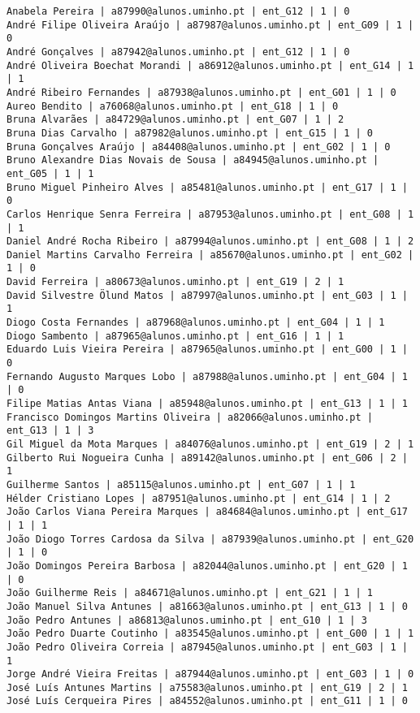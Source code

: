 \documentclass[11pt,a4paper]{report}%
\begin{document}
\begin{verbatim}
Anabela Pereira | a87990@alunos.uminho.pt | ent_G12 | 1 | 0
André Filipe Oliveira Araújo | a87987@alunos.uminho.pt | ent_G09 | 1 | 0
André Gonçalves | a87942@alunos.uminho.pt | ent_G12 | 1 | 0
André Oliveira Boechat Morandi | a86912@alunos.uminho.pt | ent_G14 | 1 | 1
André Ribeiro Fernandes | a87938@alunos.uminho.pt | ent_G01 | 1 | 0
Aureo Bendito | a76068@alunos.uminho.pt | ent_G18 | 1 | 0
Bruna Alvarães | a84729@alunos.uminho.pt | ent_G07 | 1 | 2
Bruna Dias Carvalho | a87982@alunos.uminho.pt | ent_G15 | 1 | 0
Bruna Gonçalves Araújo | a84408@alunos.uminho.pt | ent_G02 | 1 | 0
Bruno Alexandre Dias Novais de Sousa | a84945@alunos.uminho.pt | ent_G05 | 1 | 1
Bruno Miguel Pinheiro Alves | a85481@alunos.uminho.pt | ent_G17 | 1 | 0
Carlos Henrique Senra Ferreira | a87953@alunos.uminho.pt | ent_G08 | 1 | 1
Daniel André Rocha Ribeiro | a87994@alunos.uminho.pt | ent_G08 | 1 | 2
Daniel Martins Carvalho Ferreira | a85670@alunos.uminho.pt | ent_G02 | 1 | 0
David Ferreira | a80673@alunos.uminho.pt | ent_G19 | 2 | 1
David Silvestre Ölund Matos | a87997@alunos.uminho.pt | ent_G03 | 1 | 1
Diogo Costa Fernandes | a87968@alunos.uminho.pt | ent_G04 | 1 | 1
Diogo Sambento | a87965@alunos.uminho.pt | ent_G16 | 1 | 1
Eduardo Luis Vieira Pereira | a87965@alunos.uminho.pt | ent_G00 | 1 | 0
Fernando Augusto Marques Lobo | a87988@alunos.uminho.pt | ent_G04 | 1 | 0
Filipe Matias Antas Viana | a85948@alunos.uminho.pt | ent_G13 | 1 | 1
Francisco Domingos Martins Oliveira | a82066@alunos.uminho.pt | ent_G13 | 1 | 3
Gil Miguel da Mota Marques | a84076@alunos.uminho.pt | ent_G19 | 2 | 1
Gilberto Rui Nogueira Cunha | a89142@alunos.uminho.pt | ent_G06 | 2 | 1
Guilherme Santos | a85115@alunos.uminho.pt | ent_G07 | 1 | 1
Hélder Cristiano Lopes | a87951@alunos.uminho.pt | ent_G14 | 1 | 2
João Carlos Viana Pereira Marques | a84684@alunos.uminho.pt | ent_G17 | 1 | 1
João Diogo Torres Cardosa da Silva | a87939@alunos.uminho.pt | ent_G20 | 1 | 0
João Domingos Pereira Barbosa | a82044@alunos.uminho.pt | ent_G20 | 1 | 0
João Guilherme Reis | a84671@alunos.uminho.pt | ent_G21 | 1 | 1
João Manuel Silva Antunes | a81663@alunos.uminho.pt | ent_G13 | 1 | 0
João Pedro Antunes | a86813@alunos.uminho.pt | ent_G10 | 1 | 3
João Pedro Duarte Coutinho | a83545@alunos.uminho.pt | ent_G00 | 1 | 1
João Pedro Oliveira Correia | a87945@alunos.uminho.pt | ent_G03 | 1 | 1
Jorge André Vieira Freitas | a87944@alunos.uminho.pt | ent_G03 | 1 | 0
José Luís Antunes Martins | a75583@alunos.uminho.pt | ent_G19 | 2 | 1
José Luís Cerqueira Pires | a84552@alunos.uminho.pt | ent_G11 | 1 | 0

\end{verbatim}
\end{document}
